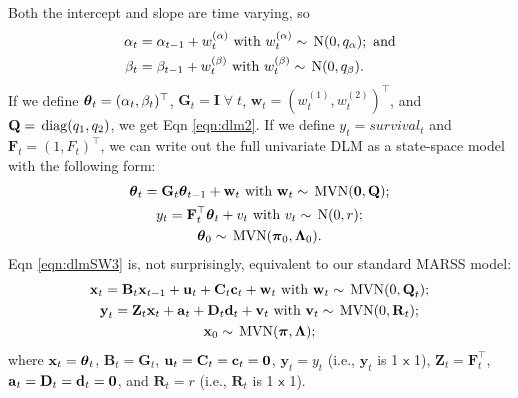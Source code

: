 \documentclass[10pt]{article}
\def\aa{\mbox{$\mathbf a$}}
\def\BB{\mbox{$\mathbf B$}}
\def\CC{\mbox{$\mathbf C$}}
\def\cc{\mbox{$\mathbf c$}}
\def\DD{\mbox{$\mathbf D$}}
\def\dd{\mbox{$\mathbf d$}}
\def\FF{\mbox{$\mathbf F$}}
\def\GG{\mbox{$\mathbf G$}}
\def\II{\mbox{$\mathbf I$}}
\def\QQ{\mbox{$\mathbf Q$}}
\def\RR{\mbox{$\mathbf R$}}
\def\uu{\mbox{$\mathbf u$}}
\def\vv{\mbox{$\mathbf v$}}
\def\ww{\mbox{$\mathbf w$}}
\def\xx{\mbox{$\mathbf x$}}
\def\yy{\mbox{$\mathbf y$}}
\def\ZZ{\mbox{$\mathbf Z$}}
\def\pipi{\mbox{\boldmath $\pi$}}
\def\ttheta{\mbox{\boldmath $\theta$}}
\def\LAM{\mbox{\boldmath $\mathrm{\Lambda}$}}
\def\zer{\mbox{\boldmath $0$}}
\def\diag{\,\textup{\textrm{diag}}}
\def\MVN{\,\textup{\textrm{MVN}}}
\def\N{\,\textup{\textrm{N}}}
\begin{document}
Both the intercept and slope are time varying, so
\begin{align}\label{eqn:dlmSW2}
\alpha_t &= \alpha_{t-1} + w_t^{(\alpha)} \text{ with } w_t^{(\alpha)} \sim \N(0,q_{\alpha}); \text{ and}\\
\beta_t &= \beta_{t-1} + w_t^{(\beta)} \text{ with } w_t^{(\beta)} \sim \N(0,q_{\beta}).
\end{align}
If we define $\ttheta_t = (\alpha_t,\beta_t)^{\top}$, $\GG_t = \II \; \forall \; t$, $\ww_t = (w_t^{(1)},w_t^{(2)})^{\top}$, and $\QQ = \diag(q_1,q_2)$, we get Eqn \ref{eqn:dlm2}. If we define $y_t = survival_t$ and $\FF_t = (1,F_t)^{\top}$, we can write out the full univariate DLM as a state-space model with the following form:
\begin{equation}\label{eqn:dlmSW3}
\begin{gathered}
\ttheta_t = \GG_t\ttheta_{t-1} + \ww_t \text{ with } \ww_t \sim \MVN(\mathbf{0},\QQ);\\
y_t = \FF_t^{\top}\ttheta_t + v_t \text{ with } v_t\sim\N(0,r);\\
\ttheta_0 \sim \MVN(\pipi_0,\LAM_0).
\end{gathered}
\end{equation}
Eqn \ref{eqn:dlmSW3} is, not surprisingly, equivalent to our standard MARSS model: 
\begin{equation}\label{eqn:MARSSdlm}
\begin{gathered}
\xx_t = \BB_t\xx_{t-1} + \uu_t + \CC_t\cc_t + \ww_t \text{ with } \ww_t \sim \MVN(0,\QQ_t);\\
\yy_t = \ZZ_t\xx_t + \aa_t + \DD_t\dd_t + \vv_t \text{ with } \vv_t \sim \MVN(0,\RR_t);\\
\xx_0 \sim \MVN(\pipi,\LAM);
\end{gathered}
\end{equation}
where $\xx_t = \ttheta_t$, $\BB_t = \GG_t$, $\uu_t = \CC_t = \cc_t = \zer$, $\yy_t = y_t$ (i.e., $\yy_t$ is 1 $\mathsf{x}$ 1), $\ZZ_t = \FF_t^{\top}$, $\aa_t = \DD_t = \dd_t = \zer$, and $\RR_t = r$ (i.e., $\RR_t$ is 1 $\mathsf{x}$ 1).
\end{document}
